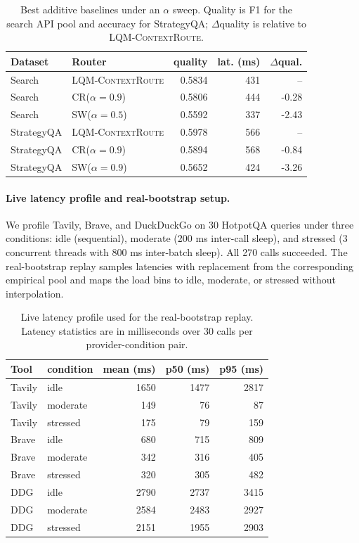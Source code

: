 \documentclass[11pt]{article}
\newcommand{\lqmcr}{\textsc{LQM-ContextRoute}}
\begin{document}
\begin{table}[ht]
\centering\scriptsize
\setlength{\tabcolsep}{3pt}
\begin{tabular}{llrrr}
\toprule
Dataset & Router & quality & lat. (ms) & $\Delta$qual. \\
\midrule
Search & \lqmcr{} & 0.5834 & 431 & -- \\
Search & CR($\alpha=0.9$) & 0.5806 & 444 & -0.28 \\
Search & SW($\alpha=0.5$) & 0.5592 & 337 & -2.43 \\
\midrule
StrategyQA & \lqmcr{} & 0.5978 & 566 & -- \\
StrategyQA & CR($\alpha=0.9$) & 0.5894 & 568 & -0.84 \\
StrategyQA & SW($\alpha=0.9$) & 0.5652 & 424 & -3.26 \\
\bottomrule
\end{tabular}
\caption{Best additive baselines under an $\alpha$ sweep. Quality is F1 for the
search API pool and accuracy for StrategyQA; $\Delta$quality is relative to
\lqmcr{}.}
\label{tab:alpha-sweep}
\end{table}

\paragraph{Live latency profile and real-bootstrap setup.}
\label{app:livelat}

We profile Tavily, Brave, and DuckDuckGo on 30 HotpotQA queries under three conditions: idle (sequential), moderate (200 ms inter-call sleep), and stressed (3 concurrent threads with 800 ms inter-batch sleep). All 270 calls succeeded. The real-bootstrap replay samples latencies with replacement from the corresponding empirical pool and maps the load bins to idle, moderate, or stressed without interpolation.

\begin{table}[ht]
\centering\scriptsize
\setlength{\tabcolsep}{3pt}
\begin{tabular}{l l rrr}
\toprule
Tool & condition & mean (ms) & p50 (ms) & p95 (ms) \\
\midrule
Tavily & idle     & 1650 & 1477 & 2817 \\
Tavily & moderate &  149 &   76 &   87 \\
Tavily & stressed &  175 &   79 &  159 \\
Brave  & idle     &  680 &  715 &  809 \\
Brave  & moderate &  342 &  316 &  405 \\
Brave  & stressed &  320 &  305 &  482 \\
DDG    & idle     & 2790 & 2737 & 3415 \\
DDG    & moderate & 2584 & 2483 & 2927 \\
DDG    & stressed & 2151 & 1955 & 2903 \\
\bottomrule
\end{tabular}
\caption{Live latency profile used for the real-bootstrap replay. Latency
statistics are in milliseconds over 30 calls per provider-condition pair.}
\label{tab:livelat}
\end{table}
\end{document}
